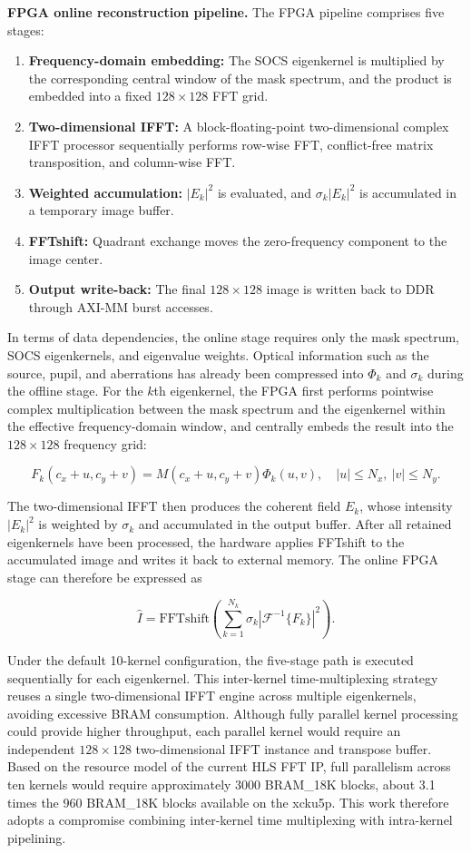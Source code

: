 \documentclass[
  preprint]{elsarticle}
\providecommand{\tightlist}{%
  \setlength{\itemsep}{0pt}\setlength{\parskip}{0pt}}
\begin{document}
\textbf{FPGA online reconstruction pipeline.} The FPGA pipeline
comprises five stages:

\begin{enumerate}
\def\labelenumi{\arabic{enumi}.}
\tightlist
\item
  \textbf{Frequency-domain embedding:} The SOCS eigenkernel is
  multiplied by the corresponding central window of the mask spectrum,
  and the product is embedded into a fixed \(128 \times 128\) FFT grid.
\item
  \textbf{Two-dimensional IFFT:} A block-floating-point two-dimensional
  complex IFFT processor sequentially performs row-wise FFT,
  conflict-free matrix transposition, and column-wise FFT.
\item
  \textbf{Weighted accumulation:} \(|E_k|^2\) is evaluated, and
  \(\sigma_k|E_k|^2\) is accumulated in a temporary image buffer.
\item
  \textbf{FFTshift:} Quadrant exchange moves the zero-frequency
  component to the image center.
\item
  \textbf{Output write-back:} The final \(128 \times 128\) image is
  written back to DDR through AXI-MM burst accesses.
\end{enumerate}

In terms of data dependencies, the online stage requires only the mask
spectrum, SOCS eigenkernels, and eigenvalue weights. Optical information
such as the source, pupil, and aberrations has already been compressed
into \(\Phi_k\) and \(\sigma_k\) during the offline stage. For the
\(k\)th eigenkernel, the FPGA first performs pointwise complex
multiplication between the mask spectrum and the eigenkernel within the
effective frequency-domain window, and centrally embeds the result into
the \(128 \times 128\) frequency grid:

\[
F_k(c_x+u,c_y+v)=M(c_x+u,c_y+v)\Phi_k(u,v),
\quad |u|\leq N_x,\ |v|\leq N_y .
\tag{7}
\]

The two-dimensional IFFT then produces the coherent field \(E_k\), whose
intensity \(|E_k|^2\) is weighted by \(\sigma_k\) and accumulated in the
output buffer. After all retained eigenkernels have been processed, the
hardware applies FFTshift to the accumulated image and writes it back to
external memory. The online FPGA stage can therefore be expressed as

\[
\hat{I}=\mathrm{FFTshift}\left(\sum_{k=1}^{N_k}\sigma_k
\left|\mathcal{F}^{-1}\{F_k\}\right|^2\right).
\tag{8}
\]

Under the default 10-kernel configuration, the five-stage path is
executed sequentially for each eigenkernel. This inter-kernel
time-multiplexing strategy reuses a single two-dimensional IFFT engine
across multiple eigenkernels, avoiding excessive BRAM consumption.
Although fully parallel kernel processing could provide higher
throughput, each parallel kernel would require an independent
\(128 \times 128\) two-dimensional IFFT instance and transpose buffer.
Based on the resource model of the current HLS FFT IP, full parallelism
across ten kernels would require approximately 3000 BRAM\_18K blocks,
about 3.1 times the 960 BRAM\_18K blocks available on the xcku5p. This
work therefore adopts a compromise combining inter-kernel time
multiplexing with intra-kernel pipelining.
\end{document}
